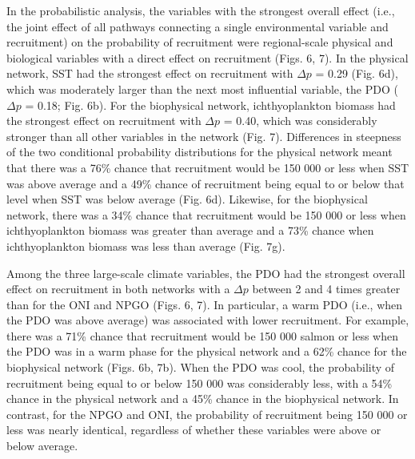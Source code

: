 In the probabilistic analysis, the variables with the strongest overall effect
(i.e., the joint effect of all pathways connecting a single environmental
variable and recruitment) on the probability of recruitment were regional-scale
physical and biological variables with a direct effect on recruitment (Figs. 6,
7). In the physical network, SST had the strongest effect on recruitment with
\(\Delta p\) = 0.29 (Fig.  6d), which was moderately larger than the next most
influential variable, the PDO (\(\Delta p\) = 0.18; Fig. 6b). For the
biophysical network, ichthyoplankton biomass had the strongest effect on
recruitment with \(\Delta p\) = 0.40, which was considerably stronger than all
other variables in the network (Fig. 7). Differences in steepness of the two
conditional probability distributions for the physical network meant that there
was a 76\% chance that recruitment would be 150 000 or less when SST was above
average and a 49\% chance of recruitment being equal to or below that level when
SST was below average (Fig. 6d). Likewise, for the biophysical network, there
was a 34\% chance that recruitment would be 150 000 or less when ichthyoplankton
biomass was greater than average and a 73\% chance when ichthyoplankton biomass
was less than average (Fig. 7g).

Among the three large-scale climate variables, the PDO had the strongest overall
effect on recruitment in both networks with a \(\Delta p\) between 2 and 4 times
greater than for the ONI and NPGO (Figs. 6, 7). In particular, a warm PDO (i.e.,
when the PDO was above average) was associated with lower recruitment. For
example, there was a 71\% chance that recruitment would be 150 000 salmon or
less when the PDO was in a warm phase for the physical network and a 62\% chance
for the biophysical network (Figs. 6b, 7b). When the PDO was cool, the
probability of recruitment being equal to or below 150 000 was considerably
less, with a 54\% chance in the physical network and a 45\% chance in the
biophysical network. In contrast, for the NPGO and ONI, the probability of
recruitment being 150 000 or less was nearly identical, regardless of whether
these variables were above or below average.

